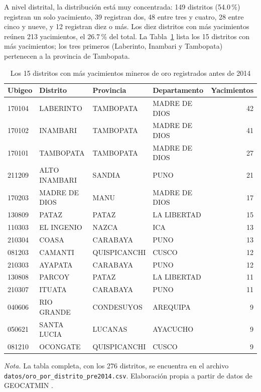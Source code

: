 \documentclass[man,12pt,a4paper,floatsintext,donotrepeattitle]{apa7}
\newcommand{\interlineadosencillo}{\renewcommand{\baselinestretch}{1}\selectfont}
\begin{document}
A nivel distrital, la distribución está muy concentrada: 149 distritos (54.0\,\%)
registran un solo yacimiento, 39 registran dos, 48 entre tres y cuatro, 28 entre
cinco y nueve, y 12 registran diez o más. Los diez distritos con más yacimientos
reúnen 213 yacimientos, el 26.7\,\% del total. La Tabla~\ref{tab:distritos} lista
los 15 distritos con más yacimientos; los tres primeros (Laberinto, Inambari y
Tambopata) pertenecen a la provincia de Tambopata.

\begin{table}[htbp]
\caption{Los 15 distritos con más yacimientos mineros de oro registrados antes de 2014}
\label{tab:distritos}
\centering
\interlineadosencillo
\begin{threeparttable}
\small
\begin{tabular}{@{}llllr@{}}
\toprule
Ubigeo & Distrito & Provincia & Departamento & Yacimientos \\
\midrule
170104 & LABERINTO     & TAMBOPATA         & MADRE DE DIOS & 42 \\
170102 & INAMBARI      & TAMBOPATA         & MADRE DE DIOS & 41 \\
170101 & TAMBOPATA     & TAMBOPATA         & MADRE DE DIOS & 27 \\
211209 & ALTO INAMBARI & SANDIA            & PUNO          & 21 \\
170203 & MADRE DE DIOS & MANU              & MADRE DE DIOS & 17 \\
130809 & PATAZ         & PATAZ             & LA LIBERTAD   & 15 \\
110303 & EL INGENIO    & NAZCA             & ICA           & 13 \\
210304 & COASA         & CARABAYA          & PUNO          & 13 \\
081203 & CAMANTI       & QUISPICANCHI      & CUSCO         & 12 \\
210303 & AYAPATA       & CARABAYA          & PUNO          & 12 \\
130808 & PARCOY        & PATAZ             & LA LIBERTAD   & 11 \\
210307 & ITUATA        & CARABAYA          & PUNO          & 11 \\
040606 & RIO GRANDE    & CONDESUYOS        & AREQUIPA      & 9 \\
050621 & SANTA LUCIA   & LUCANAS           & AYACUCHO      & 9 \\
081210 & OCONGATE      & QUISPICANCHI      & CUSCO         & 9 \\
\bottomrule
\end{tabular}
\vspace{6pt}
\begin{tablenotes}[flushleft]
\small
\item \textit{Nota.} La tabla completa, con los 276 distritos, se encuentra en
el archivo \texttt{datos/oro\_por\_distrito\_pre2014.csv}.
Elaboración propia a partir de datos de GEOCATMIN \parencite{ingemmet2026}.
\end{tablenotes}
\end{threeparttable}
\end{table}
\end{document}
